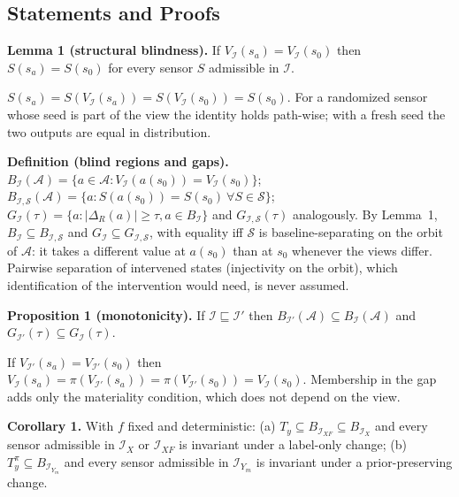 \documentclass[10pt,journal,compsoc]{IEEEtran}
\newcommand{\IX}{\mathcal I_X}
\newcommand{\IXF}{\mathcal I_{XF}}
\newcommand{\IYm}{\mathcal I_{Y_m}}
\begin{document}
\subsection{Statements and Proofs}

\textbf{Lemma 1 (structural blindness).} If $V_{\mathcal I}(s_a)=V_{\mathcal I}(s_0)$
then $S(s_a)=S(s_0)$ for every sensor $S$ admissible in $\mathcal I$.

\begin{IEEEproof}
$S(s_a)=S(V_{\mathcal I}(s_a))=S(V_{\mathcal I}(s_0))=S(s_0)$. For a
randomized sensor whose seed is part of the view the identity holds path-wise;
with a fresh seed the two outputs are equal in distribution.
\end{IEEEproof}

\textbf{Definition (blind regions and gaps).}
$B_{\mathcal I}(\mathcal A)=\{a\in\mathcal A: V_{\mathcal I}(a(s_0))=V_{\mathcal I}(s_0)\}$;
$B_{\mathcal I,\mathcal S}(\mathcal A)=\{a: S(a(s_0))=S(s_0)\ \forall S\in\mathcal S\}$;
$G_{\mathcal I}(\tau)=\{a:|\Delta_R(a)|\ge\tau, a\in B_{\mathcal I}\}$ and
$G_{\mathcal I,\mathcal S}(\tau)$ analogously. By Lemma~1,
$B_{\mathcal I}\subseteq B_{\mathcal I,\mathcal S}$ and
$G_{\mathcal I}\subseteq G_{\mathcal I,\mathcal S}$, with equality iff
$\mathcal S$ is baseline-separating on the orbit of $\mathcal A$: it takes a
different value at $a(s_0)$ than at $s_0$ whenever the views differ. Pairwise
separation of intervened states (injectivity on the orbit), which
identification of the intervention would need, is never assumed.

\textbf{Proposition 1 (monotonicity).} If $\mathcal I\sqsubseteq\mathcal I'$
then $B_{\mathcal I'}(\mathcal A)\subseteq B_{\mathcal I}(\mathcal A)$ and
$G_{\mathcal I'}(\tau)\subseteq G_{\mathcal I}(\tau)$.

\begin{IEEEproof}
If $V_{\mathcal I'}(s_a)=V_{\mathcal I'}(s_0)$ then
$V_{\mathcal I}(s_a)=\pi(V_{\mathcal I'}(s_a))=\pi(V_{\mathcal I'}(s_0))=V_{\mathcal I}(s_0)$.
Membership in the gap adds only the materiality condition, which does not
depend on the view.
\end{IEEEproof}

\textbf{Corollary 1.} With $f$ fixed and deterministic:
(a) $T_y\subseteq B_{\IXF}\subseteq B_{\IX}$ and every sensor admissible in
$\IX$ or $\IXF$ is invariant under a label-only change; (b)
$T_y^{\pi}\subseteq B_{\IYm}$ and every sensor admissible in $\IYm$ is
invariant under a prior-preserving change.
\end{document}
